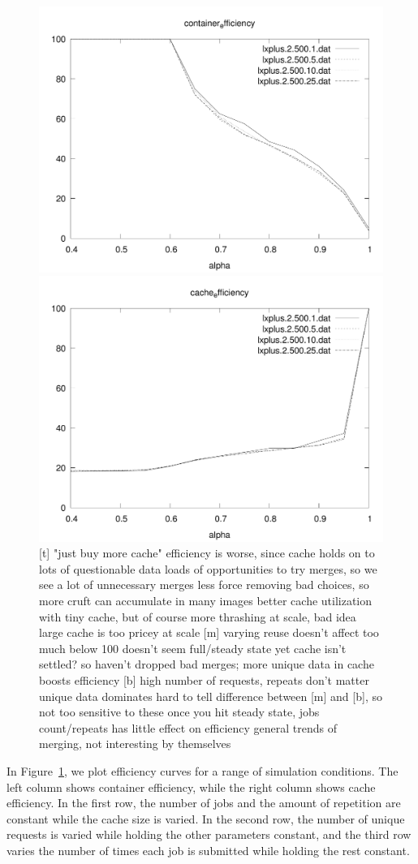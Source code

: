 \documentclass[sigconf]{acmart}
\begin{document}
\begin{figure}
\includegraphics[width=0.48\linewidth]{curated/sensitivity/container_efficiency_uses_percent_plt.pdf}
\hfill
\includegraphics[width=0.48\linewidth]{curated/sensitivity/cache_efficiency_uses_percent_plt.pdf}
\label{fig:sensitivity}
[t] "just buy more cache"
efficiency is worse, since cache holds on to lots of questionable data
loads of opportunities to try merges, so we see a lot of unnecessary merges
less force removing bad choices, so more cruft can accumulate in many images
better cache utilization with tiny cache, but of course more thrashing
at scale, bad idea
large cache is too pricey at scale
[m] varying reuse doesn't affect too much
below 100 doesn't seem full/steady state yet
cache isn't settled? so haven't dropped bad merges; more unique data in cache boosts efficiency
[b] high number of requests, repeats don't matter
unique data dominates
hard to tell difference between [m] and [b], so not too sensitive to these
once you hit steady state, jobs count/repeats has little effect on efficiency
general trends of merging, not interesting by themselves
\fi
\end{figure}

In Figure~\ref{fig:sensitivity}, we plot efficiency curves for a range of simulation conditions.
The left column shows container efficiency,
while the right column shows cache efficiency.
In the first row, the number of jobs and the amount of repetition are constant while the cache size is varied.
In the second row, the number of unique requests is varied while holding the other parameters constant,
and the third row varies the number of times each job is submitted while holding the rest constant.
\end{document}
